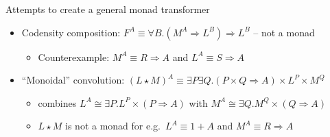 \documentclass[english]{beamer}
\begin{document}
\begin{frame}{Attempts to create a general monad transformer}
\begin{itemize}
\item Codensity composition: $F^{A}\equiv\forall B.\left(M^{A}\Rightarrow L^{B}\right)\Rightarrow L^{B}$
-- not a monad
\begin{itemize}
\item Counterexample: $M^{A}\equiv R\Rightarrow A$ and $L^{A}\equiv S\Rightarrow A$
\end{itemize}
\item ``Monoidal'' convolution: {\small{}$\left(L\star M\right)^{A}\equiv\exists P\exists Q.\left(P\times Q\Rightarrow A\right)\times L^{P}\times M^{Q}$}{\small\par}
\begin{itemize}
\item combines $L^{A}\cong\exists P.L^{P}\times\left(P\Rightarrow A\right)$
with $M^{A}\cong\exists Q.M^{Q}\times\left(Q\Rightarrow A\right)$ 
\item $L\star M$ is not a monad for e.g.~$L^{A}\equiv1+A$ and $M^{A}\equiv R\Rightarrow A$
\end{itemize}
\end{itemize}
\end{frame}
\end{document}
